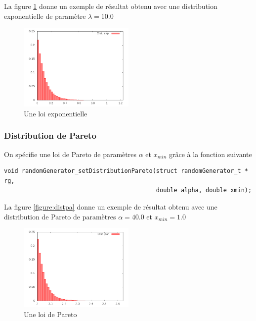    La figure \ref{figure:distexp} donne un exemple de résultat obtenu
avec une distribution exponentielle de paramètre $\lambda = 10.0$

\begin{figure}[h]
\begin{center}
\includegraphics[width=0.5\textwidth]{DistributionExp.png}
\caption{Une loi exponentielle\label{figure:distexp}}
\end{center}
\end{figure}

%
\subsubsection{Distribution de Pareto}

   On spécifie une loi de Pareto de paramètres $\alpha$ et $x_{min}$
grâce à la  fonction suivante 

\begin{verbatim}
void randomGenerator_setDistributionPareto(struct randomGenerator_t * rg,
                                           double alpha, double xmin);
\end{verbatim}

   La figure \ref{figure:distpa} donne un exemple de résultat obtenu
avec une distribution de Pareto de paramètres $\alpha = 40.0$ et
$x_{min} = 1.0$

\begin{figure}[h]
\begin{center}
\includegraphics[width=0.5\textwidth]{DistributionPar.png}
\caption{Une loi de Pareto\label{figure:distpar}}
\end{center}
\end{figure}

